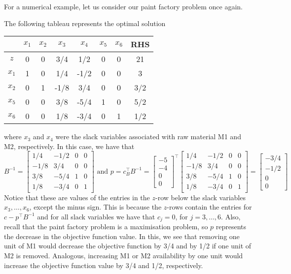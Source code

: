 For a numerical example, let us consider our paint factory problem once again. 


The following tableau represents the optimal solution
%
\begin{center}
	\begin{tabular}{c|cccccc|c}
		     & $x_1$ & $x_2$ & $x_3$ & $x_4$ & $x_5$ & $x_6$ & RHS \\ \hline 
		$z$  & 0  & 0 & 3/4 & 1/2 & 0 & 0 & 21   \\ \hline
	   $x_1$ & 1  & 0 & 1/4 & -1/2 & 0 & 0 & 3 \\
	   $x_2$ & 0  & 1 &-1/8 & 3/4 & 0 & 0 & 3/2  \\
	   $x_5$ & 0  & 0 & 3/8 &-5/4 & 1 & 0 & 5/2  \\
	   $x_6$ & 0  & 0 & 1/8 &-3/4 & 0 & 1 & 1/2  \\ \hline
	\end{tabular}
\end{center}
%
where $x_3$ and $x_4$ were the slack variables associated with raw material M1 and M2, respectively. In this case, we have that 
$$
B^{-1} = \begin{bmatrix}
 		   1/4 & -1/2 & 0 & 0 \\
		  -1/8 & 3/4 & 0 & 0 \\
		   3/8 &-5/4 & 1 & 0 \\
		   1/8 &-3/4 & 0 & 1
 		 \end{bmatrix} \text{ and } p = c_B^\top B^{-1} =  
 		 \begin{bmatrix}
 		 	-5 \\
 		 	-4 \\
 		 	0 \\
 		 	0
 		 \end{bmatrix}^\top
 		 \begin{bmatrix}
 		   1/4 & -1/2 & 0 & 0 \\
		  -1/8 & 3/4 & 0 & 0 \\
		   3/8 &-5/4 & 1 & 0 \\
		   1/8 &-3/4 & 0 & 1
 		 \end{bmatrix}  = 
 		 \begin{bmatrix}
 		 	-3/4 \\ -1/2 \\ 0 \\ 0
 		 \end{bmatrix}
$$
Notice that these are values of the entries in the $z$-row below the slack variables $x_3, \dots, x_6$, except the minus sign. This is because the $z$-rows contain the entries for $c - p^\top B^{-1}$ and for all slack variables we have that $c_j = 0$, for $j = 3,\dots,6$. Also, recall that the paint factory problem is a maximisation problem, so $p$ represents the decrease in the objective function value. In this, we see that removing one unit of M1 would decrease the objective function by 3/4 and by 1/2 if one unit of M2 is removed. Analogous, increasing M1 or M2 availability by one unit would increase the objective function value by 3/4 and 1/2, respectively. 


